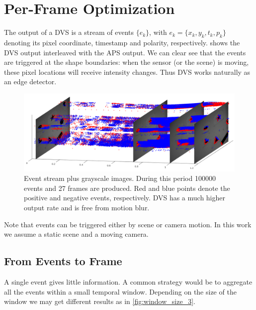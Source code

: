 \chapter{Per-Frame Optimization}
\label{chap:per_frame}
The output of a DVS is a stream of events $\{e_k\}$, with
$e_k=\{x_k,y_k,t_k,p_k\}$ denoting its pixel coordinate, timestamp and
polarity, respectively.  shows the DVS output
interleaved with the APS output. We can clear see that the events are
triggered at the shape boundaries: when the sensor (or the scene) is
moving, these pixel locations will receive intensity changes. Thus DVS
works naturally as an edge detector.

\begin{figure}[h]
  \centering \includegraphics[width = \textwidth]{images/stream.png}
  \caption{Event stream plus grayscale images. During this period
    \num{100000} events and \num{27} frames are produced. Red and blue
    points denote the positive and negative events, respectively. DVS
    has a much higher output rate and is free from motion blur.}
  \label{fig:stream}
\end{figure}
Note that events can be triggered either by scene or camera motion. In
this work we assume a static scene and a moving camera.
\section{From Events to Frame}
\label{sec:event_warp}
A single event gives little information. A common strategy would be to
aggregate all the events within a small temporal window. Depending on
the size of the window we may get different results as in
\cref{fig:window_size_3}.

